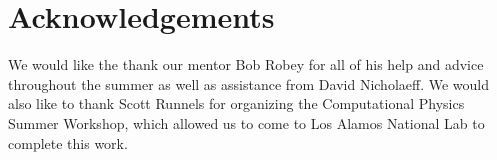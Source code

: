 \section{Acknowledgements}
We would like the thank our mentor Bob Robey for all of his help and advice throughout the summer as well as assistance from David Nicholaeff. We would also like to thank Scott Runnels for organizing the Computational Physics Summer Workshop, which allowed us to come to Los Alamos National Lab to complete this work.